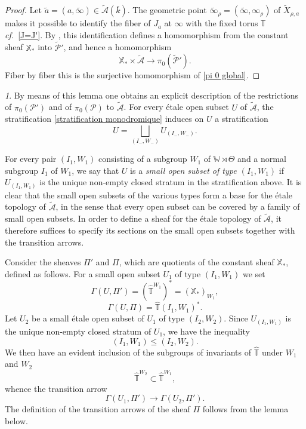 \documentclass[12pt,english]{smfart}
\numberwithin{equation}{subsection}
\theoremstyle{remark}
\newtheorem{numero}[equation]{}
\newcommand\cf{{\it cf.\ }}
\begin{document}
\begin{proof}
Let $\tilde a=(a,\tilde\infty)\in\tilde{\mathcal{A}}(\bar k)$. The geometric point $\tilde\infty_\rho=(\tilde\infty,\infty_\rho)$ of $\widetilde X_{\rho,a}$ makes it possible to identify the fiber of $J_a$ at $\infty$ with the fixed torus $\mathbb{T}$ \cf \ref{J=J'}. By \cite[6.8]{N}, this identification defines a homomorphism from the constant sheaf $\mathbb{X}_*$ into $\tilde{\mathcal{P}}'$, and hence a homomorphism
$$\mathbb{X}_*\times\tilde{\mathcal{A}}\rightarrow\pi_0(\tilde{\mathcal{P}}').$$
Fiber by fiber this is the surjective homomorphism of \ref{pi 0 global}.
\end{proof}

\begin{numero}\label{petits ouverts}
By means of this lemma one obtains an explicit description of the restrictions of $\pi_0(\mathcal{P}')$ and of $\pi_0(\mathcal{P})$ to $\tilde{\mathcal{A}}$. For every \'etale open subset $U$ of $\tilde{\mathcal{A}}$, the stratification \ref{stratification monodromique} induces on $U$ a stratification
$$U=\bigsqcup_{(I_-,W_-)}U_{(I_-,W_-)}.$$

For every pair $(I_1,W_1)$ consisting of a subgroup $W_1$ of $\mathbb{W}\rtimes\Theta$ and a normal subgroup $I_1$ of $W_1$, we say that $U$ is a {\em small open subset of type $(I_1,W_1)$} if $U_{(I_1,W_1)}$ is the unique non-empty closed stratum in the stratification above. It is clear that the small open subsets of the various types form a base for the \'etale topology of $\tilde{\mathcal{A}}$, in the sense that every open subset can be covered by a family of small open subsets. In order to define a sheaf for the \'etale topology of $\tilde{\mathcal{A}}$, it therefore suffices to specify its sections on the small open subsets together with the transition arrows.

Consider the sheaves $\Pi'$ and $\Pi$, which are quotients of the constant sheaf $\mathbb{X}_*$, defined as follows. For a small open subset $U_1$ of type $(I_1,W_1)$ we set
$$\Gamma(U,\Pi')=(\hat{\mathbb{T}}^{W_1})^*=(\mathbb{X}_*)_{W_1},$$
$$\Gamma(U,\Pi)=\hat{\mathbb{T}}(I_1,W_1)^*.$$
Let $U_2$ be a small \'etale open subset of $U_1$ of type $(I_2,W_2)$. Since $U_{(I_1,W_1)}$ is the unique non-empty closed stratum of $U_1$, we have the inequality
$$(I_1,W_1)\leq (I_2,W_2).$$
We then have an evident inclusion of the subgroups of invariants of $\hat{\mathbb{T}}$ under $W_1$ and $W_2$
$$\hat{\mathbb{T}}^{W_2}\subset\hat{\mathbb{T}}^{W_1},$$
whence the transition arrow
$$\Gamma(U_1,\Pi')\rightarrow\Gamma(U_2,\Pi').$$
The definition of the transition arrows of the sheaf $\Pi$ follows from the lemma below.
\end{numero}
\end{document}
